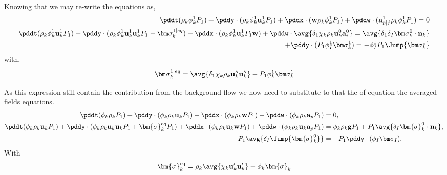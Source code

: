Knowing that we may re-write the equations as, 
\begin{align*}
    \pddt (\rho_k \phi_k^1 P_1 )
    +  \pddy \cdot (\rho_k \phi_k^1 \textbf{u}_k^1 P_1 )
    +  \pddx \cdot (\textbf{w} \rho_k \phi_k^1 P_1)
    +  \pddw \cdot (\textbf{a}_{p|f}^1 \rho_k \phi_k^1 P_1)
    = 0 \\
    \pddt  (\rho_k \phi_k^1 \textbf{u}_k^1 P_1 ) 
    +  \pddy\cdot (\rho_k \phi_k^1 \textbf{u}_k^1 \textbf{u}_k^1 P_1 
    -  \bm\sigma_k^{1|eq} )
    +  \pddx\cdot (\rho_k \phi_k^1 \textbf{u}_k^1 P_1 \textbf{w})
    +  \pddw\cdot \avg{\delta_1\chi_k \rho_k  \textbf{u}_k^0 \textbf{a}_i^0}
    = \avg{\delta_1\delta_I \bm\sigma_k^0 \cdot \textbf{n}_k}\\
    +  \pddy \cdot (P_1 \phi_I^1 \bm\sigma_k^1 )= - \phi_I^1 P_1 \Jump{\bm\sigma_k^1}
\end{align*}
with, 
\begin{equation*}
    \bm\sigma_k^{1|eq} 
    = 
    \avg{\delta_1 \chi_k \rho_k \textbf{u}_k''  \textbf{u}_k'' }
    - P_1 \phi_k^1 \bm\sigma_k^1
\end{equation*}

As this expression still contain the contribution from the background flow we now need to substitute to that the of equation the averaged fields equations. 
\begin{align*}
    \pddt (\phi_k \rho_k P_1)  
    + \pddy \cdot (
        \phi_k \rho_k\textbf{u}_k P_1
    )
    + \pddx \cdot (\phi_k \rho_k\textbf{w} P_1)
    + \pddw \cdot (\phi_k \rho_k\textbf{a}_p P_1)
    &= 
    0,\\
    \pddt (\phi_k \rho_k\textbf{u}_k P_1)  
    + \pddy \cdot (
    \phi_k \rho_k\textbf{u}_k\textbf{u}_k P_1
    + \bm{\sigma}_k^\text{eq}P_1
    )
    + \pddx \cdot (\phi_k \rho_k\textbf{u}_k\textbf{w} P_1)
    + \pddw \cdot (\phi_k \rho_k\textbf{u}_k\textbf{a}_p P_1)
    &= 
    \phi_k \rho_k \textbf{g}  P_1
    +  P_1 \avg{\delta_I \bm{\sigma}_k^0 \cdot \textbf{n}_k},\\
    P_1 \avg{\delta_I \Jump{\bm{\sigma}^0_k}}
    &= - P_1\pddy \cdot (\phi_I \bm\sigma_I),
\end{align*}
With
\begin{equation*}
    \bm{\sigma}_k^\text{eq}
    = 
     \rho_k\avg{\chi_k \textbf{u}_k'\textbf{u}_k'}
      - \phi_k \bm{\sigma}_k
\end{equation*}

